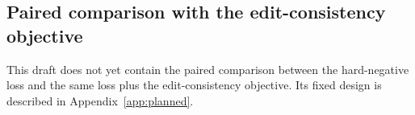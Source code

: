 \ifhavepaired

\else
\subsection{Paired comparison with the edit-consistency objective}
This draft does not yet contain the paired comparison between the hard-negative loss and the same
loss plus the edit-consistency objective. Its fixed design is described in
Appendix~\ref{app:planned}.
\fi
